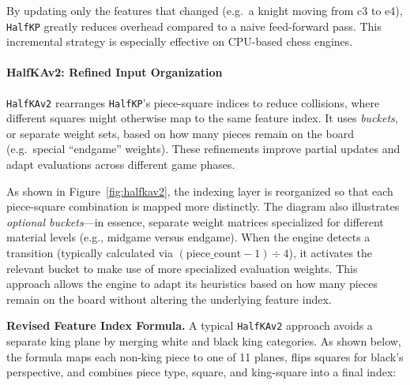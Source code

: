 \documentclass[12pt,a4paper]{article}
\begin{document}
\medskip

By updating only the features that changed (e.g.\ a knight moving from c3 to e4), \texttt{HalfKP} greatly reduces overhead compared to a naive feed-forward pass. This incremental strategy is especially effective on CPU-based chess engines.


\paragraph{HalfKAv2: Refined Input Organization}
\label{sec:halfkav2}

\texttt{HalfKAv2} rearranges \texttt{HalfKP}’s piece-square indices to reduce collisions, where different squares might otherwise map to the same feature index. It uses \emph{buckets}, or separate weight sets, based on how many pieces remain on the board (e.g.\ special “endgame” weights). These refinements improve partial updates and adapt evaluations across different game phases.

As shown in Figure~\ref{fig:halfkav2}, the indexing layer is reorganized so that
each piece-square combination is mapped more distinctly. The diagram also
illustrates \emph{optional buckets}—in essence, separate weight matrices
specialized for different material levels (e.g., midgame versus endgame).
When the engine detects a transition (typically calculated via 
\((\mathrm{piece\_count} - 1) \div 4\)), it activates the relevant bucket to
make use of more specialized evaluation weights. This approach allows the
engine to adapt its heuristics based on how many pieces remain on the board
without altering the underlying feature index.
\medskip

\noindent
\textbf{Revised Feature Index Formula.}
A typical \texttt{HalfKAv2} approach avoids a separate king plane by merging white and black king categories. 
As shown below, the formula maps each non-king piece to one of 11 planes, flips squares for black’s perspective, 
and combines piece type, square, and king-square into a final index:
\end{document}
